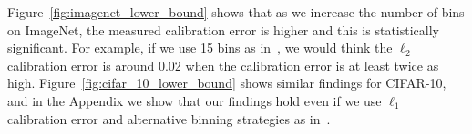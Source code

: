 Figure~\ref{fig:imagenet_lower_bound} shows that as we increase the number of bins on ImageNet, the measured calibration error is higher and this is statistically significant. For example, if we use 15 bins as in~\cite{guo2017calibration}, we would think the $\ell_2$ calibration error is around 0.02 when the calibration error is at least twice as high. Figure~\ref{fig:cifar_10_lower_bound} shows similar findings for CIFAR-10, and in the Appendix we show that our findings hold even if we use $\ell_1$ calibration error and alternative binning strategies as in~\cite{guo2017calibration}.


